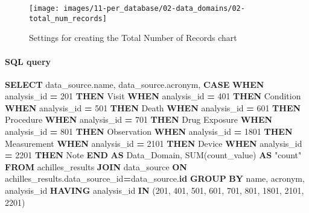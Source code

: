 \documentclass[
]{book}
\newenvironment{Shaded}{\begin{snugshade}}{\end{snugshade}}
\newcommand{\ControlFlowTok}[1]{\textcolor[rgb]{0.13,0.29,0.53}{\textbf{#1}}}
\newcommand{\DecValTok}[1]{\textcolor[rgb]{0.00,0.00,0.81}{#1}}
\newcommand{\FunctionTok}[1]{\textcolor[rgb]{0.00,0.00,0.00}{#1}}
\newcommand{\KeywordTok}[1]{\textcolor[rgb]{0.13,0.29,0.53}{\textbf{#1}}}
\newcommand{\NormalTok}[1]{#1}
\newcommand{\OperatorTok}[1]{\textcolor[rgb]{0.81,0.36,0.00}{\textbf{#1}}}
\newcommand{\OtherTok}[1]{\textcolor[rgb]{0.56,0.35,0.01}{#1}}
\newcommand{\StringTok}[1]{\textcolor[rgb]{0.31,0.60,0.02}{#1}}
\begin{document}
\begin{figure}
\texttt{[image: images/11-per\_database/02-data\_domains/02-total\_num\_records]} \caption{Settings for creating the Total Number of Records chart}\label{fig:totalNumRecords}
\end{figure}

\hypertarget{sql-query-30}{%
\paragraph*{SQL query}\label{sql-query-30}}

\begin{Shaded}
\begin{Highlighting}[]
\KeywordTok{SELECT}
\NormalTok{data\_source.name,}
\NormalTok{data\_source.acronym,}
    \ControlFlowTok{CASE} 
    \ControlFlowTok{WHEN}\NormalTok{ analysis\_id }\OperatorTok{=} \DecValTok{201} \ControlFlowTok{THEN} \StringTok{\textquotesingle{}Visit\textquotesingle{}}
    \ControlFlowTok{WHEN}\NormalTok{ analysis\_id }\OperatorTok{=} \DecValTok{401} \ControlFlowTok{THEN} \StringTok{\textquotesingle{}Condition\textquotesingle{}}
    \ControlFlowTok{WHEN}\NormalTok{ analysis\_id }\OperatorTok{=} \DecValTok{501} \ControlFlowTok{THEN} \StringTok{\textquotesingle{}Death\textquotesingle{}}
    \ControlFlowTok{WHEN}\NormalTok{ analysis\_id }\OperatorTok{=} \DecValTok{601} \ControlFlowTok{THEN} \StringTok{\textquotesingle{}Procedure\textquotesingle{}}
    \ControlFlowTok{WHEN}\NormalTok{ analysis\_id }\OperatorTok{=} \DecValTok{701} \ControlFlowTok{THEN} \StringTok{\textquotesingle{}Drug Exposure\textquotesingle{}}
    \ControlFlowTok{WHEN}\NormalTok{ analysis\_id }\OperatorTok{=} \DecValTok{801} \ControlFlowTok{THEN} \StringTok{\textquotesingle{}Observation\textquotesingle{}}
    \ControlFlowTok{WHEN}\NormalTok{ analysis\_id }\OperatorTok{=} \DecValTok{1801} \ControlFlowTok{THEN} \StringTok{\textquotesingle{}Measurement\textquotesingle{}}
    \ControlFlowTok{WHEN}\NormalTok{ analysis\_id }\OperatorTok{=} \DecValTok{2101} \ControlFlowTok{THEN} \StringTok{\textquotesingle{}Device\textquotesingle{}}
    \ControlFlowTok{WHEN}\NormalTok{ analysis\_id }\OperatorTok{=} \DecValTok{2201} \ControlFlowTok{THEN} \StringTok{\textquotesingle{}Note\textquotesingle{}}
    \ControlFlowTok{END} \KeywordTok{AS}\NormalTok{ Data\_Domain,}
    \FunctionTok{SUM}\NormalTok{(count\_value) }\KeywordTok{AS} \OtherTok{"count"}
\KeywordTok{FROM}\NormalTok{ achilles\_results}
\KeywordTok{JOIN}\NormalTok{ data\_source }\KeywordTok{ON}\NormalTok{ achilles\_results.data\_source\_id}\OperatorTok{=}\NormalTok{data\_source.}\KeywordTok{id}
\KeywordTok{GROUP} \KeywordTok{BY}\NormalTok{ name, acronym, analysis\_id}
\KeywordTok{HAVING}\NormalTok{ analysis\_id }\KeywordTok{IN}\NormalTok{ (}\DecValTok{201}\NormalTok{, }\DecValTok{401}\NormalTok{, }\DecValTok{501}\NormalTok{, }\DecValTok{601}\NormalTok{, }\DecValTok{701}\NormalTok{, }\DecValTok{801}\NormalTok{, }\DecValTok{1801}\NormalTok{, }\DecValTok{2101}\NormalTok{, }\DecValTok{2201}\NormalTok{)}
\end{Highlighting}
\end{Shaded}
\end{document}
